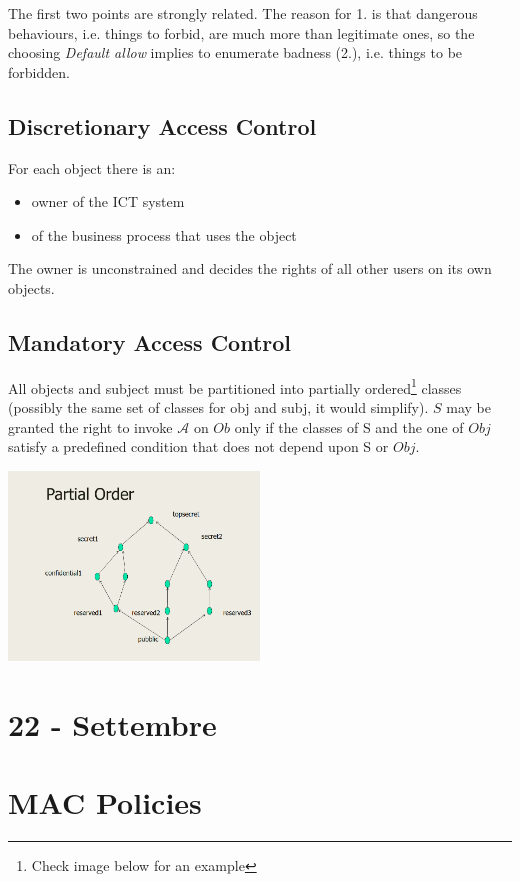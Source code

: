 The first two points are strongly related.
The reason for 1. is that dangerous behaviours, i.e. things to forbid, are much more than legitimate ones,
so the choosing \textit{Default allow} implies to enumerate badness (2.), i.e. things to be forbidden.

\subsection{Discretionary Access Control}
For each object there is an:
\begin{itemize}
    \item owner of the ICT system
    \item of the business process that uses the object
\end{itemize}
The owner is unconstrained and decides the rights of all other users on its own objects.

\subsection{Mandatory Access Control}
All objects and subject must be partitioned into partially ordered\footnote{Check image below for an example} classes (possibly the same set of classes for obj and subj, it would simplify).
$S$ may be granted the right to invoke $\mathcal{A}$ on $Ob$ only if the classes of S and the one of $Obj$ satisfy a predefined condition that does not depend upon S or $Obj$.

\begin{center}
    \includegraphics[width=0.5\textwidth]{images/partial_ordering.png}
\end{center}

\section*{22 - Settembre}
\section{MAC Policies}
